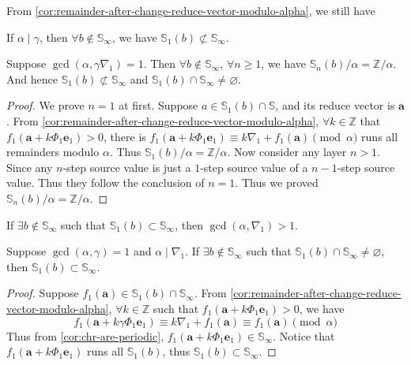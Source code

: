 From \cref{cor:remainder-after-change-reduce-vector-modulo-alpha}, we still have
\begin{proposition}
    If $\alpha \mid \gamma$, then $\forall b\not\in\mathbb{S}_{\infty}$, we have $\mathbb{S}_{1}(b) \not\subset \mathbb{S}_{\infty}$.
\end{proposition}
\begin{proposition}\label{prop:gcd-1-derive-not-all-primitive}
    Suppose $\gcd(\alpha, \gamma\nabla_1) = 1$. Then $\forall b\not\in\mathbb{S}_{\infty}$, $\forall n\ge 1$, we have $\mathbb{S}_{n}(b)/\alpha = \mathbb{Z}/\alpha$. And hence $\mathbb{S}_{1}(b) \not\subset \mathbb{S}_{\infty}$ and $\mathbb{S}_{1}(b) \cap \mathbb{S}_{\infty} \ne\varnothing$.
\end{proposition}
\begin{proof}
    We prove $n=1$ at first.\newline
    Suppose $a \in\mathbb{S}_{1}(b) \cap \mathbb{S}$, and its reduce vector is $\bm{a}$.
    From \cref{cor:remainder-after-change-reduce-vector-modulo-alpha}, $\forall k\in\mathbb{Z}$ that $f_{1}(\bm{a} + k\Phi_1\bm{e}_1) > 0$, there is $f_{1}(\bm{a} + k\Phi_1\bm{e}_1) \equiv k\nabla_1 + f_{1}(\bm{a}) \pmod{\alpha}$ runs all remainders modulo $\alpha$. Thus $\mathbb{S}_{1}(b)/\alpha = \mathbb{Z}/\alpha$.\newline
    Now consider any layer $n > 1$. Since any $n$-step source value is just a $1$-step source value of a $n-1$-step source value. Thus they follow the conclusion of $n=1$. Thus we proved $\mathbb{S}_{n}(b)/\alpha = \mathbb{Z}/\alpha$.
\end{proof}
\begin{proposition}\label{prop:all-primitive-derive-gcd-ge-1}
    If $\exists b\not\in\mathbb{S}_{\infty}$ such that $\mathbb{S}_{1}(b) \subset \mathbb{S}_{\infty}$, then $\gcd(\alpha, \nabla_1) > 1$.
\end{proposition}
\begin{proposition}\label{prop:have-primitive-derive-all-primitive}
    Suppose $\gcd(\alpha, \gamma) = 1$ and $\alpha\mid\nabla_1$. If $\exists b\not\in\mathbb{S}_{\infty}$ such that $\mathbb{S}_{1}(b) \cap \mathbb{S}_{\infty} \ne \varnothing$, then $\mathbb{S}_{1}(b) \subset \mathbb{S}_{\infty}$.
\end{proposition}
\begin{proof}
    Suppose $f_{1}(\bm{a}) \in\mathbb{S}_{1}(b) \cap \mathbb{S}_{\infty}$.
    From \cref{cor:remainder-after-change-reduce-vector-modulo-alpha}, $\forall k\in\mathbb{Z}$ such that $f_{1}(\bm{a} + k\Phi_1\bm{e}_1) > 0$, we have
    \[ f_{1}(\bm{a} + k\gamma\Phi_1\bm{e}_1) \equiv k\nabla_1 + f_{1}(\bm{a}) \equiv f_{1}(\bm{a})  \pmod{\alpha} \]
    Thus from \cref{cor:chr-are-periodic}, $f_{1}(\bm{a} + k\Phi_1\bm{e}_1) \in \mathbb{S}_{\infty}$. Notice that $f_{1}(\bm{a} + k\Phi_1\bm{e}_1)$ runs all $\mathbb{S}_{1}(b)$, thus $\mathbb{S}_{1}(b) \subset \mathbb{S}_{\infty}$.
\end{proof}

